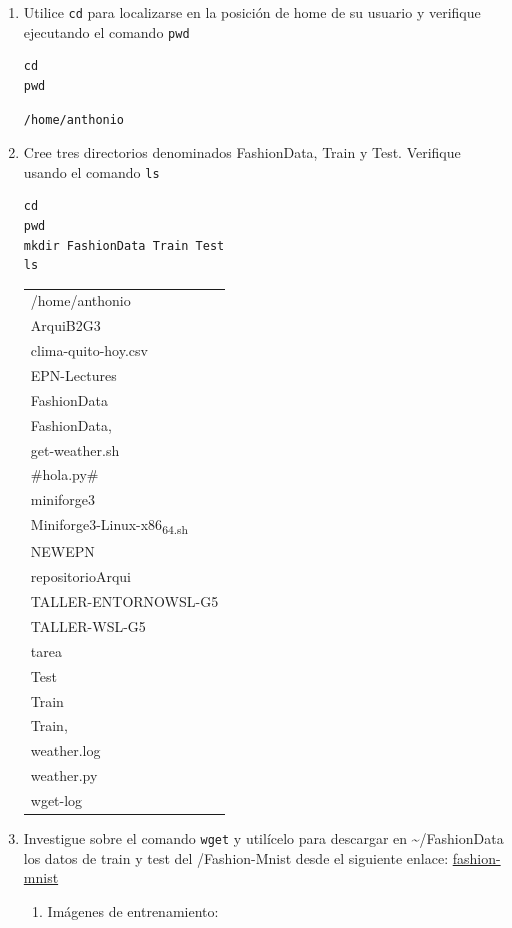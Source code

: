 \documentclass{article}
\begin{document}
\begin{enumerate}
\item Utilice \texttt{cd} para localizarse en la posición de home de su usuario y
verifique ejecutando el comando \texttt{pwd}
\begin{verbatim}
cd
pwd
\end{verbatim}

\label{org81d4225}
\begin{verbatim}
/home/anthonio
\end{verbatim}

\item Cree tres directorios denominados FashionData, Train y
Test. Verifique usando el comando \texttt{ls}
\begin{verbatim}
cd
pwd
mkdir FashionData Train Test
ls
\end{verbatim}

\begin{table}[htbp]
\label{tab:org6f17ac4}
\centering
\begin{tabular}{l}
/home/anthonio\\
ArquiB2G3\\
clima-quito-hoy.csv\\
EPN-Lectures\\
FashionData\\
FashionData,\\
get-weather.sh\\
\#hola.py\#\\
miniforge3\\
Miniforge3-Linux-x86\textsubscript{64.sh}\\
NEWEPN\\
repositorioArqui\\
TALLER-ENTORNOWSL-G5\\
TALLER-WSL-G5\\
tarea\\
Test\\
Train\\
Train,\\
weather.log\\
weather.py\\
wget-log\\
\end{tabular}
\end{table}

\item Investigue sobre el comando \texttt{wget} y utilícelo para descargar en
\textasciitilde{}/FashionData los datos de train y test del /Fashion-Mnist desde el
siguiente enlace: \href{https://github.com/zalandoresearch/fashion-mnist}{fashion-mnist}
\begin{enumerate}
\item Imágenes de entrenamiento:


\end{enumerate}
\end{enumerate}
\end{document}

